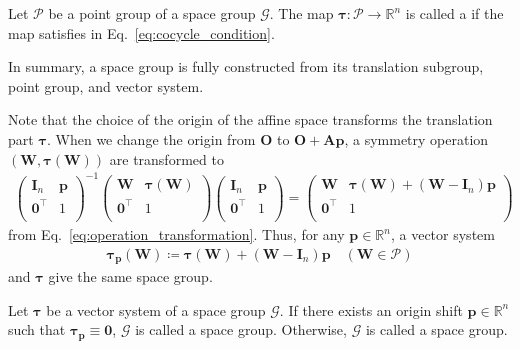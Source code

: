 \begin{screen}
  \begin{defn}
    Let $\mathcal{P}$ be a point group of a space group $\mathcal{G}$.
    The map $\bm{\tau}: \mathcal{P} \to \mathbb{R}^{n}$ is called a  if the map satisfies  in Eq.~\eqref{eq:cocycle_condition}.
  \end{defn}
\end{screen}
In summary, a space group is fully constructed from its translation subgroup, point group, and vector system.

Note that the choice of the origin of the affine space transforms the translation part $\bm{\tau}$.
When we change the origin from $\bm{O}$ to $\bm{O} + \bm{Ap}$, a symmetry operation $(\bm{W}, \bm{\tau}(\bm{W}))$ are transformed to
\begin{align*}
  \begin{pmatrix}
    \bm{I}_{n} & \bm{p} \\
    \bm{0}^{\top} & 1 \\
  \end{pmatrix}^{-1}
  \begin{pmatrix}
    \bm{W} & \bm{\tau}(\bm{W}) \\
    \bm{0}^{\top} & 1 \\
  \end{pmatrix}
  \begin{pmatrix}
    \bm{I}_{n} & \bm{p} \\
    \bm{0}^{\top} & 1 \\
  \end{pmatrix}
  =
  \begin{pmatrix}
    \bm{W} & \bm{\tau}(\bm{W}) + (\bm{W} - \bm{I}_{n})\bm{p} \\
    \bm{0}^{\top} & 1 \\
  \end{pmatrix}
\end{align*}
from Eq.~\eqref{eq:operation_transformation}.
Thus, for any $\bm{p} \in \mathbb{R}^{n}$, a vector system
\begin{align}
  \bm{\tau}_{\bm{p}}(\bm{W})
    \coloneqq \bm{\tau}(\bm{W}) + (\bm{W} - \bm{I}_{n}) \bm{p}
    \quad (\bm{W} \in \mathcal{P})
\end{align}
and $\bm{\tau}$ give the same space group.

\begin{screen}
  \begin{defn}
    Let $\bm{\tau}$ be a vector system of a space group $\mathcal{G}$.
    If there exists an origin shift $\bm{p} \in \mathbb{R}^{n}$ such that $\bm{\tau}_{\bm{p}} \equiv \bm{0}$, $\mathcal{G}$ is called a  space group.
    Otherwise, $\mathcal{G}$ is called a  space group.
  \end{defn}
\end{screen}


